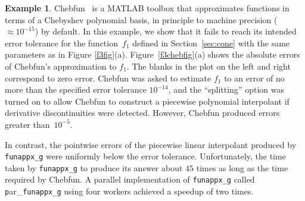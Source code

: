 \documentclass[review]{elsarticle}
\theoremstyle{definition}
\newtheorem{exmp}{Example}
\newcommand{\funappxg}{\texttt{funappx\_g}\xspace}
\begin{document}
\begin{exmp}
Chebfun~\cite{TrefEtal16a} is a MATLAB toolbox that approximates functions in
terms of a Chebyshev polynomial basis, in principle to machine precision
($\approx 10^{-15}$) by default. In this example, we show that it fails to reach
its intended error tolerance for the function~$f_1$ defined in
Section~\ref{sec:cone} with the same parameters as in Figure \ref{f3fig}(a).
Figure~\ref{f3chebfig}(a) shows the absolute errors of Chebfun's approximation to
$f_1$. The blanks in the plot on the left and right correspond to zero error.
Chebfun was asked to estimate $f_1$ to an error of no more than the specified
error tolerance $10^{-14}$, and the ``splitting'' option was turned on to allow
Chebfun to construct a piecewise polynomial interpolant if derivative
discontinuities were detected. However, Chebfun produced errors greater than~$10^{-5}$.

In contrast, the pointwise errors of the piecewise linear interpolant produced
by \funappxg{} were uniformly below the error tolerance. Unfortunately, the time
taken by \funappxg{} to produce its answer about $45$ times as long as the time
required by Chebfun. A parallel implementation of \funappxg called {\texttt
par\_}\funappxg{} using four workers achieved a speedup of two times.


\end{exmp}
\end{document}
